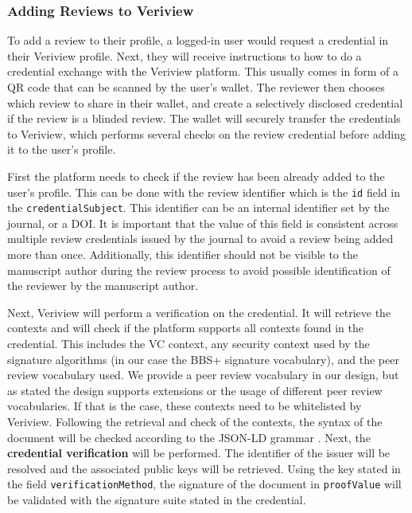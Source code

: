 

\subsubsection{Adding Reviews to Veriview}

To add a review to their profile, a logged-in user would request a credential in their Veriview profile. Next, they will receive instructions to how to do a credential exchange with the Veriview platform. This usually comes in form of a QR code that can be scanned by the user's wallet. The reviewer then chooses which review to share in their wallet, and create a selectively disclosed credential if the review is a blinded review. The wallet will securely transfer the credentials to Veriview, which performs several checks on the review credential before adding it to the user's profile.

First the platform needs to check if the review has been already added to the user's profile. This can be done with the review identifier which is the \lstinline{id} field in the \lstinline{credentialSubject}. This identifier can be an internal identifier set by the journal, or a \acrshort{DOI}. It is important that the value of this field is consistent across multiple review credentials issued by the journal to avoid a review being added more than once. Additionally, this identifier should not be visible to the manuscript author during the review process to avoid possible identification of the reviewer by the manuscript author.

Next, Veriview will perform a verification on the credential. It will retrieve the contexts and will check if the platform supports all contexts found in the credential. This includes the \acrshort{VC} context, any security context used by the signature algorithms (in our case the BBS+ signature vocabulary), and the peer review vocabulary used. We provide a peer review vocabulary in our design, but as stated the design supports extensions or the usage of different peer review vocabularies. If that is the case, these contexts need to be whitelisted by Veriview. Following the retrieval and check of the contexts, the syntax of the document will be checked according to the \acrshort{JSON-LD} grammar \parencite{jsonld}. Next, the \textbf{credential verification} will be performed. The identifier of the issuer will be resolved and the associated public keys will be retrieved. Using the key stated in the field \lstinline{verificationMethod}, the signature of the document in \lstinline{proofValue} will be validated with the signature suite stated in the credential. 

